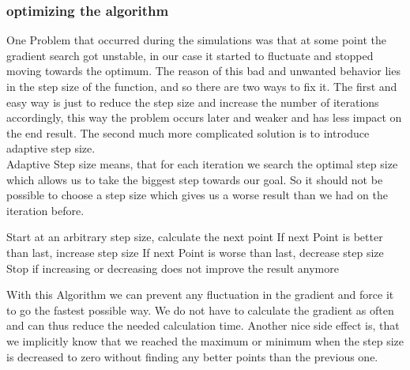 \subsubsection{optimizing the algorithm}
One Problem that occurred during the simulations was that at some point the gradient search got unstable, in our case it started to fluctuate and stopped moving towards the optimum. The reason of this bad and unwanted behavior lies in the step size of the function, and so there are two ways to fix it. The first and easy way is just to reduce the step size and increase the number of iterations accordingly, this way the problem occurs later and weaker and has less impact on the end result. The second much more complicated solution is to introduce adaptive step size.\\
Adaptive Step size means, that for each iteration we search the optimal step size which allows us to take the biggest step towards our goal. So it should not be possible to choose a step size which gives us a worse result than we had on the iteration before.
\begin{algorithm}
	Start at an arbitrary step size, calculate the next point
	If next Point is better than last, increase step size
	If next Point is worse than last, decrease step size
	Stop if increasing or decreasing does not improve the result anymore
\end{algorithm}
With this Algorithm we can prevent any fluctuation in the gradient and force it to go the fastest possible way. We do not have to calculate the gradient as often and can thus reduce the needed calculation time. Another nice side effect is, that we implicitly know that we reached the maximum or minimum when the step size is decreased to zero without finding any better points than the previous one.

